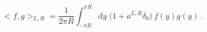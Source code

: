 \begin{equation}
<f,g>_{L,R} = \frac{1}{2\pi R} \int_{-\pi R}^{\pi R} \mathrm{d}y\;
\big(1+a^{L,R} \delta_0 \big) \, f(y) g(y) \, .
\end{equation}

